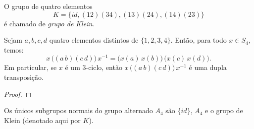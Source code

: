 \documentclass[11pt,openany]{book}
\newenvironment{novo}{
    \color{red}
}{}
\begin{document}
\begin{definition}
\label{def:klein_group}
    O grupo de quatro elementos $$K = \{id, (12)(34), (13)(24), (14)(23)\}$$ é chamado de \textit{grupo de Klein}.
\end{definition}

\begin{novo}
\begin{proposition}
\label{prop:conjugacao_transpocicao}
    Sejam \(a,b,c,d\) quatro elementos distintos de \(\{1,2,3,4\}\). Então, para todo \(x\in S_4\), temos:
    \[
    x\,\bigl((a\,b)(c\,d)\bigr)\,x^{-1} = \bigl(x(a)\,x(b)\bigr)\,\bigl(x(c)\,x(d)\bigr).
    \]
    Em particular, se \(x\) é um \(3\)-ciclo, então \(x\,\bigl((a\,b)(c\,d)\bigr)\,x^{-1}\) é uma dupla transposição.
\end{proposition}
\begin{proof}

\end{proof}
\end{novo}

\begin{theorem}
\label{klein_subgrupos}
    Os únicos subgrupos normais do grupo alternado $A_4$ são $\{id\}$, $A_4$ e o grupo de Klein (denotado aqui por $K$). 
\end{theorem}
\end{document}
